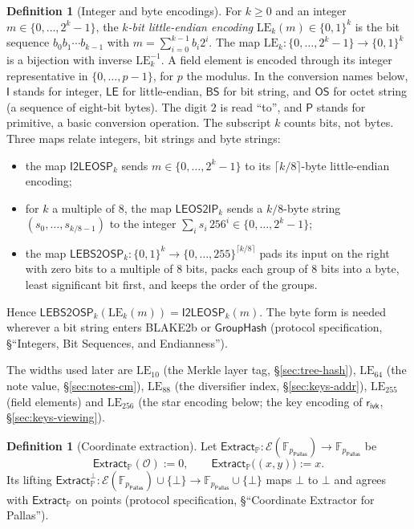 \documentclass[11pt,a4paper]{article}
\theoremstyle{definition}
\newtheorem{definition}[theorem]{Definition}
\newcommand{\F}{\mathbb{F}}
\newcommand{\PP}{\mathbb{P}}
\newcommand{\Pallas}{\ensuremath{\mathsf{Pallas}}}
\newcommand{\Ep}{\ensuremath{\mathcal{E}}}
\newcommand{\Extract}{\ensuremath{\mathsf{Extract}}}
\newcommand{\GroupHash}{\ensuremath{\mathsf{GroupHash}}}
\newcommand{\rivk}{\ensuremath{\mathsf{r_{ivk}}}}
\begin{document}
\begin{definition}[Integer and byte encodings]
For $k \ge 0$ and an integer $m \in \{0, \dots, 2^k - 1\}$, the
\emph{$k$-bit little-endian encoding} $\mathrm{LE}_k(m) \in \{0,1\}^k$ is the
bit sequence $b_0 b_1 \cdots b_{k-1}$ with $m = \sum_{i=0}^{k-1} b_i 2^i$.
The map $\mathrm{LE}_k \colon \{0, \dots, 2^k - 1\} \to \{0,1\}^k$ is a
bijection with inverse $\mathrm{LE}_k^{-1}$. A field element is encoded
through its integer representative in $\{0, \dots, p - 1\}$, for $p$ the
modulus. In the conversion names below, $\mathsf{I}$ stands for integer,
$\mathsf{LE}$ for little-endian, $\mathsf{BS}$ for bit string, and
$\mathsf{OS}$ for octet string (a sequence of eight-bit bytes). The digit
$2$ is read ``to'', and $\mathsf{P}$ stands for primitive, a basic conversion
operation. The subscript $k$ counts bits, not bytes. Three maps relate
integers, bit strings and byte strings:
\begin{itemize}
\item the map $\mathsf{I2LEOSP}_k$ sends $m \in \{0, \dots, 2^k - 1\}$ to its
  $\lceil k/8 \rceil$-byte little-endian encoding;
\item for $k$ a multiple of $8$, the map $\mathsf{LEOS2IP}_k$ sends a
  $k/8$-byte string $(s_0, \dots, s_{k/8-1})$ to the integer
  $\sum_{i} s_i\, 256^i \in \{0, \dots, 2^k - 1\}$;
\item the map $\mathsf{LEBS2OSP}_k \colon \{0,1\}^k \to
  \{0, \dots, 255\}^{\lceil k/8 \rceil}$ pads its input on the right with
  zero bits to a multiple of $8$ bits, packs each group of $8$ bits into a
  byte, least significant bit first, and keeps the order of the groups.
\end{itemize}
Hence $\mathsf{LEBS2OSP}_k(\mathrm{LE}_k(m)) = \mathsf{I2LEOSP}_k(m)$. The byte
form is needed wherever a bit string enters BLAKE2b or $\GroupHash$
(protocol specification, \S``Integers, Bit Sequences, and Endianness'').
\end{definition}

The widths used later are $\mathrm{LE}_{10}$ (the Merkle layer tag,
\S\ref{sec:tree-hash}), $\mathrm{LE}_{64}$ (the note value,
\S\ref{sec:notes-cm}), $\mathrm{LE}_{88}$ (the diversifier index,
\S\ref{sec:keys-addr}), $\mathrm{LE}_{255}$ (field elements) and
$\mathrm{LE}_{256}$ (the star encoding below; the key encoding of $\rivk$,
\S\ref{sec:keys-viewing}).

\begin{definition}[Coordinate extraction]
Let $\Extract_{\PP} \colon \Ep(\F_{p_{\Pallas}}) \to \F_{p_{\Pallas}}$ be
\[
  \Extract_{\PP}(\mathcal{O}) := 0, \qquad
  \Extract_{\PP}\bigl((x, y)\bigr) := x .
\]
Its lifting $\Extract_{\PP}^{\bot} \colon \Ep(\F_{p_{\Pallas}}) \cup \{\bot\}
\to \F_{p_{\Pallas}} \cup \{\bot\}$ maps $\bot$ to $\bot$ and agrees with
$\Extract_{\PP}$ on points (protocol specification, \S``Coordinate Extractor
for Pallas'').
\end{definition}
\end{document}
